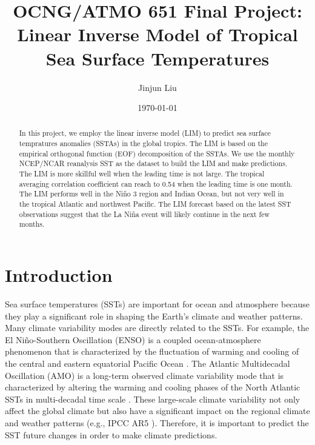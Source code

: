 \documentclass[12pt,a4paper]{article}
\title{OCNG/ATMO 651 Final Project: Linear Inverse Model of Tropical Sea Surface Temperatures}
\author{Jinjun Liu}
\date{\today}
\begin{document}
\maketitle
\thispagestyle{empty}
\begin{abstract}

In this project, we employ the linear inverse model (LIM) to predict sea surface tempratures anomalies (SSTAs) in the global tropics. The LIM is based on the empirical orthogonal function (EOF) decomposition of the SSTAs. We use the monthly NCEP/NCAR reanalysis SST as the dataset to build the LIM and make predictions. The LIM is more skillful well when the leading time is not large. The tropical averaging correlation coefficient can reach to 0.54 when the leading time is one month. The LIM performs well in the Ni\~no 3 region and Indian Ocean, but not very well in the tropical Atlantic and northwest Pacific. The LIM forecast based on the latest SST observations suggest that the La Ni\~na event will likely continue in the next few months.

\end{abstract}

\tableofcontents

\clearpage %

\section{Introduction} %

Sea surface temperatures (SSTs) are important for ocean and atmosphere because they play a significant role in shaping the Earth's climate and weather patterns. Many climate variability modes are directly related to the SSTs. For example, the El Ni\~no-Southern Oscillation (ENSO) is a coupled ocean-atmosphere phenomenon that is characterized by the fluctuation of warming and cooling of the central and eastern equatorial Pacific Ocean \cite{McPhaden2006}. The Atlantic Multidecadal Oscillation (AMO) is a long-term observed climate variability mode that is characterized by altering the warming and cooling phases of the North Atlantic SSTs in multi-decadal time scale \cite{Knight2006}. These large-scale climate variability not only affect the global climate but also have a significant impact on the regional climate and weather patterns (e.g., IPCC AR5 \cite{christensen2013climate}). Therefore, it is important to predict the SST future changes in order to make climate predictions.
\end{document}
